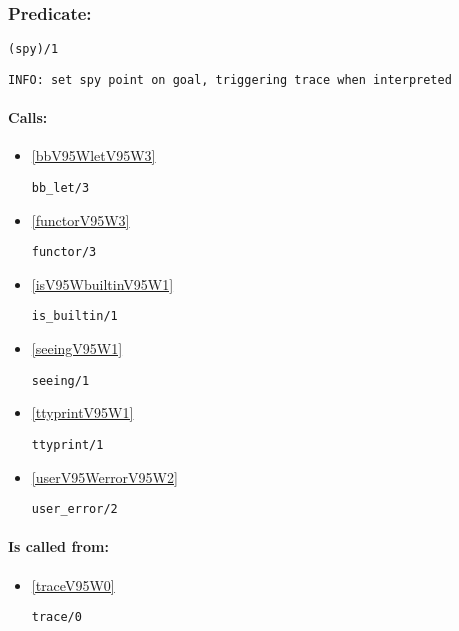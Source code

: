 \subsubsection{Predicate:} \label{spyV95W1}

\begin{verbatim}
(spy)/1
\end{verbatim}

{\small \begin{verbatim}
INFO: set spy point on goal, triggering trace when interpreted

\end{verbatim}}
\paragraph{Calls:} 
\begin{itemize}
\item \ref{bbV95WletV95W3} 
\begin{verbatim}
bb_let/3
\end{verbatim}

\item \ref{functorV95W3} 
\begin{verbatim}
functor/3
\end{verbatim}

\item \ref{isV95WbuiltinV95W1} 
\begin{verbatim}
is_builtin/1
\end{verbatim}

\item \ref{seeingV95W1} 
\begin{verbatim}
seeing/1
\end{verbatim}

\item \ref{ttyprintV95W1} 
\begin{verbatim}
ttyprint/1
\end{verbatim}

\item \ref{userV95WerrorV95W2} 
\begin{verbatim}
user_error/2
\end{verbatim}

\end{itemize}
\paragraph{Is called from:} 
\begin{itemize}
\item \ref{traceV95W0} 
\begin{verbatim}
trace/0
\end{verbatim}

\end{itemize}

